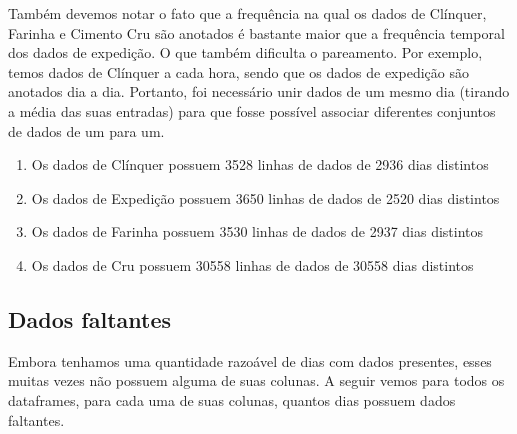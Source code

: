\documentclass[a4paper]{article}
\begin{document}
Também devemos notar o fato que a frequência na qual os dados de Clínquer, Farinha e Cimento Cru são anotados é bastante maior que a frequência temporal dos dados de expedição. O que também dificulta o pareamento. Por exemplo, temos dados de Clínquer a cada hora, sendo que os dados de expedição são anotados dia a dia. Portanto, foi necessário unir dados de um mesmo dia (tirando a média das suas entradas) para que fosse possível associar diferentes conjuntos de dados de um para um.
\begin{enumerate}
    \item Os dados de  Clínquer possuem 3528 linhas de dados de 2936 dias distintos
\item Os dados de  Expedição possuem 3650 linhas de dados de 2520 dias distintos
\item Os dados de  Farinha possuem 3530 linhas de dados de 2937 dias distintos
\item Os dados de  Cru possuem 30558 linhas de dados de 30558 dias distintos
\end{enumerate}

\subsection{Dados faltantes}
Embora tenhamos uma quantidade razoável de dias com dados presentes, esses muitas vezes não possuem alguma de suas colunas.
A seguir vemos para todos os dataframes, para cada uma de suas colunas, quantos dias possuem dados faltantes.
\end{document}
